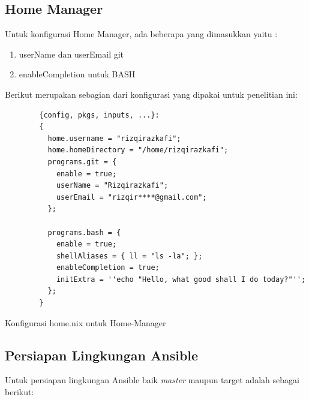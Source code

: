 \documentclass[10pt,twoside]{report}
\newenvironment{code}{\captionsetup{type=listing}}{\vspace{3mm}}
\begin{document}
\begin{adjustwidth}{20pt}{}
	\subsection{Home Manager}

	\begin{adjustwidth}{20pt}{}
		Untuk konfigurasi Home Manager, ada beberapa yang dimasukkan yaitu :
		\begin{enumerate}[nolistsep]
			\item userName dan userEmail git
			\item enableCompletion untuk BASH
		\end{enumerate}

		Berikut merupakan sebagian dari konfigurasi yang dipakai untuk penelitian ini:

		\begin{code}
			\begin{verbatim}
        {config, pkgs, inputs, ...}:
        {
          home.username = "rizqirazkafi";
          home.homeDirectory = "/home/rizqirazkafi";
          programs.git = {
            enable = true;
            userName = "Rizqirazkafi";
            userEmail = "rizqir****@gmail.com";
          };

          programs.bash = {
            enable = true;
            shellAliases = { ll = "ls -la"; };
            enableCompletion = true;
            initExtra = ''echo "Hello, what good shall I do today?"'';
          };
        }
      \end{verbatim}
			\caption{Konfigurasi home.nix untuk Home-Manager}
		\end{code}
	\end{adjustwidth}
	\subsection{Persiapan Lingkungan Ansible}
	\begin{adjustwidth}{20pt}{}
		Untuk persiapan lingkungan Ansible baik \textit{master} maupun target adalah
		sebagai berikut:
	\end{adjustwidth}

\end{adjustwidth}
\end{document}
